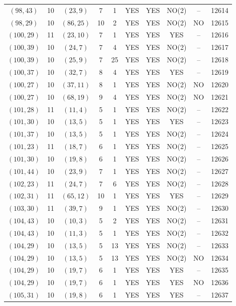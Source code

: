 \begin{longtable}{|c|c|c|c|c|c|c|c|c|c|}
$(98, 43)$ & 10 & $(23, 9)$ & 7 & 1 & YES & YES & NO(2) & -- & 12614\\
$(98, 29)$ & 10 & $(86, 25)$ & 10 & 2 & YES & YES & NO(2) & NO & 12615\\
$(100, 29)$ & 11 & $(23, 10)$ & 7 & 1 & YES & YES & YES & -- & 12616\\
$(100, 39)$ & 10 & $(24, 7)$ & 7 & 4 & YES & YES & NO(2) & -- & 12617\\
$(100, 39)$ & 10 & $(25, 9)$ & 7 & 25 & YES & YES & NO(2) & -- & 12618\\
$(100, 37)$ & 10 & $(32, 7)$ & 8 & 4 & YES & YES & YES & -- & 12619\\
$(100, 27)$ & 10 & $(37, 11)$ & 8 & 1 & YES & YES & NO(2) & NO & 12620\\
$(100, 27)$ & 10 & $(68, 19)$ & 9 & 4 & YES & YES & NO(2) & NO & 12621\\
$(101, 28)$ & 11 & $(11, 4)$ & 5 & 1 & YES & YES & NO(2) & -- & 12622\\
$(101, 30)$ & 10 & $(13, 5)$ & 5 & 1 & YES & YES & YES & -- & 12623\\
$(101, 37)$ & 10 & $(13, 5)$ & 5 & 1 & YES & YES & NO(2) & -- & 12624\\
$(101, 23)$ & 11 & $(18, 7)$ & 6 & 1 & YES & YES & NO(2) & -- & 12625\\
$(101, 30)$ & 10 & $(19, 8)$ & 6 & 1 & YES & YES & NO(2) & -- & 12626\\
$(101, 44)$ & 10 & $(23, 9)$ & 7 & 1 & YES & YES & NO(2) & -- & 12627\\
$(102, 23)$ & 11 & $(24, 7)$ & 7 & 6 & YES & YES & NO(2) & -- & 12628\\
$(102, 31)$ & 11 & $(65, 12)$ & 10 & 1 & YES & YES & YES & -- & 12629\\
$(103, 30)$ & 11 & $(39, 7)$ & 9 & 1 & YES & YES & NO(2) & -- & 12630\\
$(104, 43)$ & 10 & $(10, 3)$ & 5 & 2 & YES & YES & NO(2) & -- & 12631\\
$(104, 43)$ & 10 & $(11, 3)$ & 5 & 1 & YES & YES & NO(2) & -- & 12632\\
$(104, 29)$ & 10 & $(13, 5)$ & 5 & 13 & YES & YES & NO(2) & -- & 12633\\
$(104, 29)$ & 10 & $(13, 5)$ & 5 & 13 & YES & YES & NO(2) & NO & 12634\\
$(104, 29)$ & 10 & $(19, 7)$ & 6 & 1 & YES & YES & YES & -- & 12635\\
$(104, 29)$ & 10 & $(19, 7)$ & 6 & 1 & YES & YES & YES & NO & 12636\\
$(105, 31)$ & 10 & $(19, 8)$ & 6 & 1 & YES & YES & YES & -- & 12637\\

\end{longtable}

